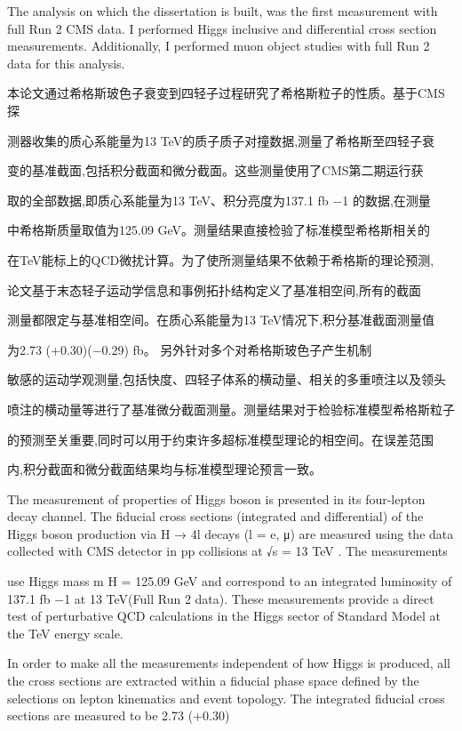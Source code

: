 The analysis on which the dissertation is built, was the first measurement with full Run 2 CMS data.
I performed Higgs inclusive and differential cross section measurements. Additionally, I performed muon object studies with full Run 2 data for this analysis.


本论文通过希格斯玻色子衰变到四轻子过程研究了希格斯粒子的性质。基于CMS探

测器收集的质心系能量为13 TeV的质子质子对撞数据,测量了希格斯至四轻子衰

变的基准截面,包括积分截面和微分截面。这些测量使用了CMS第二期运行获

取的全部数据,即质心系能量为13 TeV、积分亮度为137.1 fb −1 的数据,在测量

中希格斯质量取值为125.09 GeV。测量结果直接检验了标准模型希格斯相关的

在TeV能标上的QCD微扰计算。为了使所测量结果不依赖于希格斯的理论预测,

论文基于末态轻子运动学信息和事例拓扑结构定义了基准相空间,所有的截面

测量都限定与基准相空间。在质心系能量为13 TeV情况下,积分基准截面测量值

为2.73 (+0.30)(−0.29) fb。 另外针对多个对希格斯玻色子产生机制

敏感的运动学观测量,包括快度、四轻子体系的横动量、相关的多重喷注以及领头

喷注的横动量等进行了基准微分截面测量。测量结果对于检验标准模型希格斯粒子

的预测至关重要,同时可以用于约束许多超标准模型理论的相空间。在误差范围

内,积分截面和微分截面结果均与标准模型理论预言一致。




The measurement of properties of Higgs boson is presented in its four-lepton decay channel. The fiducial cross sections (integrated and differential) of the Higgs boson production via H → 4l decays (l = e, μ) are measured using the data collected with CMS detector in pp collisions at √s = 13 TeV . The measurements

use Higgs mass m H = 125.09 GeV and correspond to an integrated luminosity of 137.1 fb −1 at 13 TeV(Full Run 2 data). These measurements provide a direct test of perturbative QCD calculations in the Higgs sector of Standard Model at the TeV energy scale.

In order to make all the measurements independent of how Higgs is produced, all the cross sections are extracted within a fiducial phase space defined by the selections on lepton kinematics and event topology. The integrated fiducial cross sections are measured to be 2.73 (+0.30)

